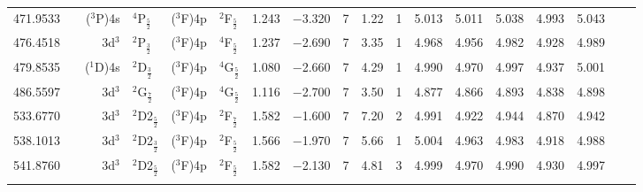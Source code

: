 \documentclass[traditabstract]{aa}
\newcommand{\pst}{\phantom{*}}
\begin{document}
\begin{center}
\begin{mpsupertabular}{r@{}c@{\ \ \ }r@{~}l@{\ }r@{~}l@{\ \ \ }c@{\ \ \ }c@{\ \ \ }c@{\ \ \ }c@{\ \ \ }c@{\ \ \ }c@{\ \ \ }c@{\ \ \ }c@{\ \ \ }c@{\ \ \ }c@{\ \ \ }r@{\ \ \ }c}
471.9533 & & \footnotesize ($^3$P)4s &\footnotesize$^4$P$_\frac{5}{2}$   &\footnotesize($^3$F)4p  &\footnotesize$^2$F$_\frac{5}{2}$   & 1.243 & $-$3.320 & 7  & 1.22 & 1\pst      & 5.013 & 5.011 & 5.038 & 4.993 & 5.043 & & \\
476.4518 & \color{BrickRed}{$^a$}					                                 									                                         		                       
           & \footnotesize 3d$^3$    &\footnotesize$^2$P$_\frac{3}{2}$   &\footnotesize($^3$F)4p  &\footnotesize$^4$F$_\frac{5}{2}$   & 1.237 & $-$2.690 & 7  & 3.35 & 1\pst      & 4.968 & 4.956 & 4.982 & 4.928 & 4.989 & & \\
479.8535 & \color{BrickRed}{$^a$}					                          										                                         		                       
           & \footnotesize ($^1$D)4s &\footnotesize$^2$D$_\frac{3}{2}$   &\footnotesize($^3$F)4p  &\footnotesize$^4$G$_\frac{5}{2}$   & 1.080 & $-$2.660 & 7  & 4.29 & 1\pst      & 4.990 & 4.970 & 4.997 & 4.937 & 5.001 & & \\
486.5597 & \color{BrickRed}{$^a$}									  									                                         		                       
           & \footnotesize 3d$^3$    &\footnotesize$^2$G$_\frac{7}{2}$   &\footnotesize($^3$F)4p  &\footnotesize$^4$G$_\frac{5}{2}$   & 1.116 & $-$2.700 & 7  & 3.50 & 1\pst      & 4.877 & 4.866 & 4.893 & 4.838 & 4.898 & & \\
533.6770 & \color{BrickRed}{$^a$}			                             												                                         		                       
           & \footnotesize 3d$^3$    &\footnotesize$^2$D2$_\frac{5}{2}$  &\footnotesize($^3$F)4p  &\footnotesize$^2$F$_\frac{7}{2}$   & 1.582 & $-$1.600 & 7  & 7.20 & 2\pst      & 4.991 & 4.922 & 4.944 & 4.870 & 4.942 & & \\
538.1013 & \color{BrickRed}{$^a$}											                 					                                         		                       
           & \footnotesize 3d$^3$    &\footnotesize$^2$D2$_\frac{3}{2}$  &\footnotesize($^3$F)4p  &\footnotesize$^2$F$_\frac{5}{2}$   & 1.566 & $-$1.970 & 7  & 5.66 & 1\pst      & 5.004 & 4.963 & 4.983 & 4.918 & 4.988 & & \\
541.8760 & \color{BrickRed}{$^a$}				                        											                                         		                       
           & \footnotesize 3d$^3$    &\footnotesize$^2$D2$_\frac{5}{2}$  &\footnotesize($^3$F)4p  &\footnotesize$^2$F$_\frac{5}{2}$   & 1.582 & $-$2.130 & 7  & 4.81 & 3\pst      & 4.999 & 4.970 & 4.990 & 4.930 & 4.997 & & \\
   & & & & & & & & & & & & & & & \\
                        

\end{mpsupertabular}
\end{center}
\end{document}
